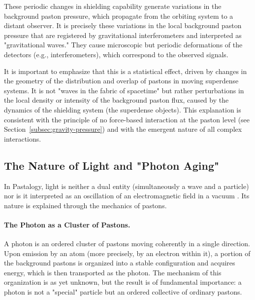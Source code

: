 \documentclass[pdflatex,sn-mathphys-num]{sn-jnl}
\begin{document}
These periodic changes in shielding capability generate variations in the background paston pressure, which propagate from the orbiting system to a distant observer. It is precisely these variations in the local background paston pressure that are registered by gravitational interferometers and interpreted as "gravitational waves." They cause microscopic but periodic deformations of the detectors (e.g., interferometers), which correspond to the observed signals.

It is important to emphasize that this is a statistical effect, driven by changes in the geometry of the distribution and overlap of pastons in moving superdense systems. It is not "waves in the fabric of spacetime" but rather perturbations in the local density or intensity of the background paston flux, caused by the dynamics of the shielding system (the superdense objects). This explanation is consistent with the principle of no force-based interaction at the paston level (see Section~\ref{subsec:gravity-pressure}) and with the emergent nature of all complex interactions.

\subsection{The Nature of Light and "Photon Aging"}\label{subsec:light-aging}

In Pastalogy, light is neither a dual entity (simultaneously a wave and a particle) \cite{debroglie1924-thesis} nor is it interpreted as an oscillation of an electromagnetic field in a vacuum \cite{maxwell1873-treatise}. Its nature is explained through the mechanics of pastons.

\paragraph{The Photon as a Cluster of Pastons.}
A photon is an ordered cluster of pastons moving coherently in a single direction. Upon emission by an atom (more precisely, by an electron within it), a portion of the background pastons is organized into a stable configuration and acquires energy, which is then transported as the photon. The mechanism of this organization is as yet unknown, but the result is of fundamental importance: a photon is not a "special" particle but an ordered collective of ordinary pastons.
\end{document}
